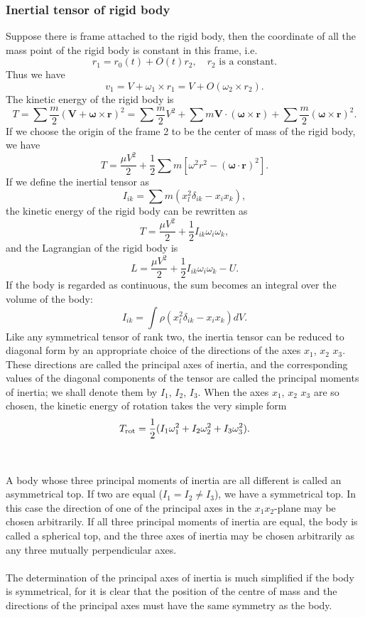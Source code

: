 \subsubsection{Inertial tensor of rigid body}
Suppose there is frame attached to the rigid body, then the coordinate of all the mass point of the rigid body is constant in this frame, i.e.
\[r_1 = r_0(t) + O(t)r_2 ,\quad r_2 \mbox{ is a constant}.\]
Thus we have
\[v_1 = V + \omega_1 \times r_1 = V + O(\omega_2 \times r_2).\]
The kinetic energy of the rigid body is
\[T = \sum \frac{m}{2} (\bm{V} + \bm{\omega} \times \bm{r})^2 = \sum \frac{m}{2} V^2 + \sum m\bm{V}\cdot(\bm{\omega}\times\bm{r}) + \sum \frac{m}{2} (\bm{\omega} \times \bm{r})^2.\]
If we choose the origin of the frame 2 to be the center of mass of the rigid body, we have
\[T = \frac{\mu V^2}{2} + \frac{1}{2}\sum m [\omega^2r^2-(\bm{\omega} \cdot \bm{r})^2].\]
If we define the inertial tensor as
\[I_{ik} = \sum m (x_l^2 \delta_{ik} - x_i x_k),\]
the kinetic energy of the rigid body can be rewritten as
\[T = \frac{\mu V^2}{2} + \frac{1}{2} I_{ik}\omega_i \omega_k ,\]
and the Lagrangian of the rigid body is
\[L = \frac{\mu V^2}{2} + \frac{1}{2} I_{ik}\omega_i \omega_k -U.\]
If the body is regarded as continuous, the sum becomes an integral over the volume of the body:
\[I_{ik} = \int \rho (x_l^2 \delta_{ik} - x_i x_k) dV.\]
Like any symmetrical tensor of rank two, the inertia tensor can be reduced to diagonal form by an appropriate choice of the directions of the axes $x_1$, $x_2$ $x_3$. 
These directions are called the principal axes of inertia, and the corresponding values of the diagonal components of the tensor are called the principal moments of inertia; we shall denote them by $I_1$, $I_2$, $I_3$. 
When the axes $x_1$, $x_2$ $x_3$ are so chosen, the kinetic energy of rotation takes the very simple form
\[T_{\rm rot} = \frac{1}{2} (I_1 \omega_1^2 + I_2 \omega_2^2 + I_3 \omega_3^2).\]
\\ \\
A body whose three principal moments of inertia are all different is called an asymmetrical top. 
If two are equal ($I_1 = I_2 \neq I_3$), we have a symmetrical top. 
In this case the direction of one of the principal axes in the $x_1x_2$-plane may be chosen arbitrarily.
If all three principal moments of inertia are equal, the body is called a spherical top, and the three axes of inertia may be chosen arbitrarily as any three mutually perpendicular axes.
\\ \\
The determination of the principal axes of inertia is much simplified if the body is symmetrical, for it is clear that the position of the centre of mass and the directions of the principal axes must have the same symmetry as the body.
